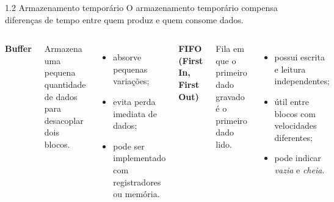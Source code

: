 \begin{frame}{1.2 Armazenamento temporário}
  O armazenamento temporário compensa diferenças de tempo entre quem produz e quem consome dados.
  \begin{columns}[T]
      \textbf{Buffer}\par
      Armazena uma pequena quantidade de dados para desacoplar dois blocos.
      \begin{itemize}
        \item absorve pequenas variações;
        \item evita perda imediata de dados;
        \item pode ser implementado com registradores ou memória.
      \end{itemize}
      \textbf{FIFO (First In, First Out)}\par
      Fila em que o primeiro dado gravado é o primeiro dado lido.
      \begin{itemize}
        \item possui escrita e leitura independentes;
        \item útil entre blocos com velocidades diferentes;
        \item pode indicar \textit{vazia} e \textit{cheia}.
      \end{itemize}
  \end{columns}
\end{frame}